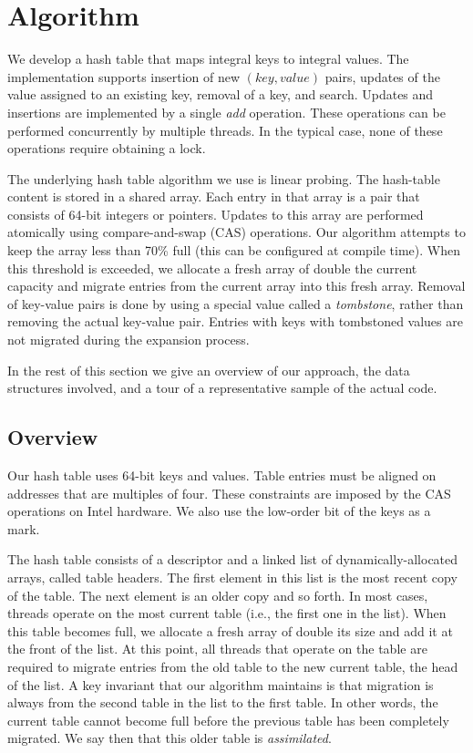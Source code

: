 \section{Algorithm}
\label{sec:algo}

We develop a hash table that maps integral keys to integral
values. The implementation supports insertion of new $(key,value)$
pairs, updates of the value assigned to an existing key, removal of a
key, and search. Updates and insertions are implemented by a single
{\em add\/} operation. These operations can be performed concurrently
by multiple threads. In the typical case, none of these operations
require obtaining a lock.

The underlying hash table algorithm we use is linear probing. The
hash-table content is stored in a shared array. Each entry in that
array is a pair that consists of 64-bit integers or pointers. Updates
to this array are performed atomically using compare-and-swap (CAS)
operations. Our algorithm attempts to keep the array less than 70\%
full (this can be configured at compile time). When this threshold is
exceeded, we allocate a fresh array of double the current capacity and
migrate entries from the current array into this fresh array. Removal
of key-value pairs is done by using a special value called a 
{\em tombstone\/}, rather than removing the actual key-value pair.
Entries with keys with tombstoned values are not migrated during the expansion process.

In the rest of this section we give an overview of our approach, the
data structures involved, and a tour of a representative sample of the
actual code.


\subsection{Overview}

Our hash table uses 64-bit keys and values. Table entries must be
aligned on addresses that are multiples of four. These constraints are
imposed by the CAS operations on Intel hardware. We also use the low-order
bit of the keys as a mark.

The hash table consists of a descriptor and a linked list of
dynamically-allocated arrays, called table headers.
The first element in this list is the
most recent copy of the table. The next element is an older copy and
so forth.  In most cases, threads operate on the most current table
(i.e., the first one in the list). When this table becomes full, we
allocate a fresh array of double its size and add it at the front of
the list.  At this point, all threads that operate on the table are
required to migrate entries from the old table to the new current
table, the head of the list. A key invariant that our algorithm
maintains is that migration is always from the second table in the
list to the first table. In other words, the current table cannot
become full before the previous table has been completely migrated.
We say then that this older table is {\em assimilated\/}.

